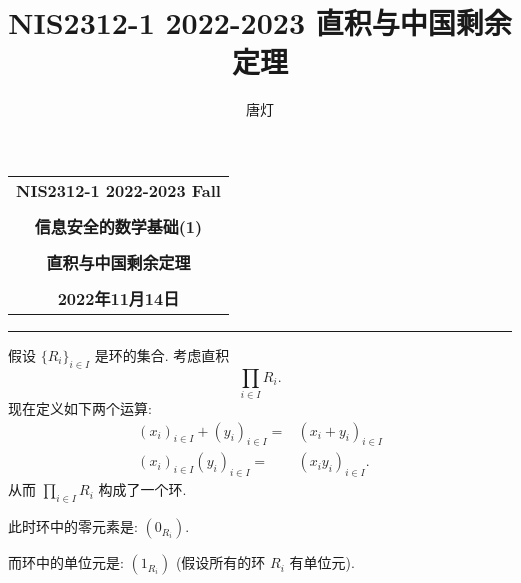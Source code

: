\documentclass[a4paper,12pt]{ctexart}
\title{NIS2312-1 2022-2023 直积与中国剩余定理}
\author{唐灯}
\begin{document}
  \begin{center}

  \vspace{-0.3in}
  \begin{tabular}{c}
    \textbf{\Large NIS2312-1 2022-2023 Fall} \\
    \textbf{\Large  } \\
    \textbf{\Large  信息安全的数学基础(1)} \\
    \textbf{\Large  } \\
    \textbf{\Large  直积与中国剩余定理} \\
    \textbf{\Large  } \\
    \textbf{\Large 2022年11月14日} \\
  \end{tabular}
  \end{center}
  \noindent
  \rule{\linewidth}{0.4pt}

  假设 $ \{R_i\}_{i\in I} $ 是环的集合. 考虑直积
  \[\prod_{i\in I}R_i.\]
  现在定义如下两个运算:
  \begin{align*}
    \left(x_i\right)_{i \in I}+\left(y_i\right)_{i \in I}=&\left(x_i+y_i\right)_{i \in I} \\
    \left(x_i\right)_{i \in I}\left(y_i\right)_{i \in I}=&\left(x_i y_i\right)_{i \in I}.
  \end{align*}
  从而 $ \prod_{i \in I} R_i $ 构成了一个环.

  此时环中的零元素是: $\left(0_{R_i}\right) $.

  而环中的单位元是: $ \left(1_{R_i}\right) $ (假设所有的环 $ R_i $ 有单位元).
\end{document}
